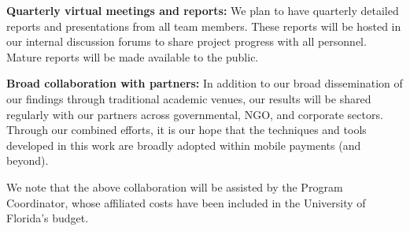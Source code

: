 \vspace{0.2cm} \noindent \textbf{Quarterly virtual meetings and
reports:} We plan to have quarterly detailed reports and presentations
from all team members. These reports will be hosted in our internal
discussion forums to share project progress with all personnel. Mature
reports will be made available to the public.

\vspace{0.2cm} \noindent \textbf{Broad collaboration with partners:} In
addition to our broad dissemination of our findings through traditional
academic venues, our results will be shared regularly with our partners
across governmental, NGO, and corporate sectors. Through our combined
efforts, it is our hope that the techniques and tools developed in this
work are broadly adopted within mobile payments (and beyond).

We note that the above collaboration will be assisted by the Program
Coordinator, whose affiliated costs have been included in the University
of Florida's budget.


%
%



